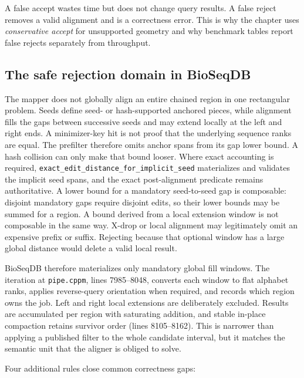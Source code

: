 A false accept wastes time but does not change query results.  A false reject
removes a valid alignment and is a correctness error.  This is why the chapter
uses \emph{conservative accept} for unsupported geometry and why benchmark
tables report false rejects separately from throughput.

\subsection{The safe rejection domain in BioSeqDB}

The mapper does not globally align an entire chained region in one rectangular
problem. Seeds define seed- or hash-supported anchored pieces, while alignment
fills the gaps between successive seeds and may extend locally at the left and
right ends. A minimizer-key hit is not proof that the underlying sequence
ranks are equal. The prefilter therefore omits anchor spans from its gap lower
bound. A hash collision can only make that bound looser. Where exact accounting
is required, \texttt{exact\_edit\_distance\_for\_implicit\_seed} materializes
and validates the implicit seed spans, and the exact post-alignment predicate
remains authoritative. A lower bound for a mandatory seed-to-seed gap is composable:
disjoint mandatory gaps require disjoint edits, so their lower bounds may be
summed for a region.  A bound derived from a local extension window is not
composable in the same way.  X-drop or local alignment may legitimately omit
an expensive prefix or suffix.  Rejecting because that optional window has a
large global distance would delete a valid local result.

BioSeqDB therefore materializes only mandatory global fill windows.  The
iteration at \texttt{pipe.cppm}, lines 7985--8048, converts each window to flat
alphabet ranks, applies reverse-query orientation when required, and records
which region owns the job.  Left and right local extensions are deliberately
excluded.  Results are accumulated per region with saturating addition, and
stable in-place compaction retains survivor order (lines 8105--8162).  This is
narrower than applying a published filter to the whole candidate interval, but
it matches the semantic unit that the aligner is obliged to solve.

Four additional rules close common correctness gaps:

